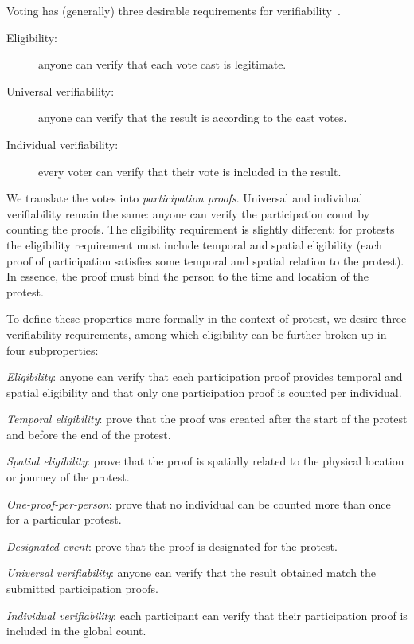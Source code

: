 Voting has (generally) three desirable requirements for verifiability~\cite{VerifyingPrivacyPropertiesOfVotingProtocols}.
\begin{description}
  \item[Eligibility:] anyone can verify that each vote cast is legitimate.
  \item[Universal verifiability:] anyone can verify that the result is according 
    to the cast votes.
  \item[Individual verifiability:] every voter can verify that their vote is 
    included in the result.
\end{description}
We translate the votes into \emph{participation proofs}.
Universal and individual verifiability remain the same: anyone can verify the participation count by counting the proofs.
The eligibility requirement is slightly different: for protests the eligibility requirement must include temporal and spatial 
eligibility (\ie each proof of participation satisfies some temporal and spatial relation to the protest).
In essence, the proof must bind the person to the time and location of the protest.

To define these properties more formally in the context of protest, we desire three verifiability requirements, among which eligibility can be further broken up in four subproperties:
\begin{requirements}[V]
  \item\label{EligibilityVerif} \emph{Eligibility}:
    anyone can verify that each participation proof provides temporal and 
    spatial eligibility and that only one participation proof is counted per 
    individual.
    \begin{requirements}
    \item\label{TemporallyRelated} \emph{Temporal eligibility}:
      prove that the proof was created after the start of the protest and
      before the end of the protest.
    \item\label{SpatiallyRelated} \emph{Spatial eligibility}:
      prove that the proof is spatially related to the physical location or 
      journey of the protest.
    \item\label{CountOnce} \emph{One-proof-per-person}:
      prove that no individual can be counted more than once for a particular 
      protest.
    \item\label{DesignatedEvent} \emph{Designated event}:
      prove that the proof is designated for the protest.
    \end{requirements}

  \item\label{UniversalVerif} \emph{Universal verifiability}:
    anyone can verify that the result obtained match the submitted participation 
    proofs.

  \item\label{IndividualVerif} \emph{Individual verifiability}:
    each participant can verify that their participation proof is included in 
    the global count.
\end{requirements}


